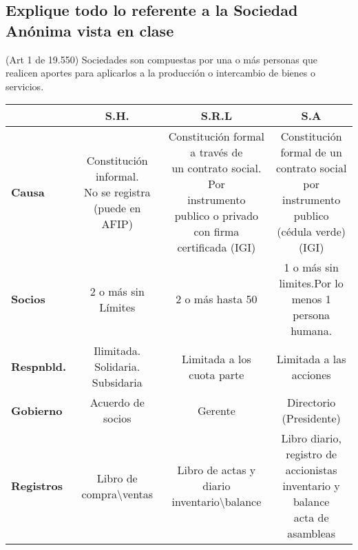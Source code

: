 \documentclass{article}
\begin{document}
\subsection{Explique todo lo referente a la Sociedad Anónima vista en clase}
(Art 1 de 19.550) Sociedades son compuestas por una o más personas que realicen aportes para aplicarlos a la producción o intercambio de bienes o servicios.
\begin{table}[htb!]
{\footnotesize
\begin{tabular}{@{}lccc@{}}
\toprule
\textbf{}                & \textbf{S.H.}                                         & \textbf{S.R.L}                                                                                                    & \textbf{S.A}                                                                           \\ \midrule
\textbf{Causa}           &\makecell{ Constitución informal.\\ No se registra\\ (puede en AFIP)} & \makecell{Constitución formal a través de\\ un contrato social. Por \\ instrumento publico o privado \\con firma  certificada (IGI)} & \makecell{ Constitución formal de un\\ contrato social por instrumento\\ publico (cédula verde) (IGI) }\\ \hline
\textbf{Socios}& 2 o más sin Límites& 2 o más hasta 50& \makecell{1 o más sin limites.Por lo \\ menos 1 persona humana. }\\ \hline
\textbf{Respnbld.} & Ilimitada. Solidaria. Subsidaria & Limitada a los cuota parte& Limitada a las acciones \\\hline
\textbf{Gobierno}        & Acuerdo de socios& Gerente & Directorio (Presidente) \\\hline
\textbf{Registros}       & Libro de compra\textbackslash{}ventas & \makecell{ Libro de actas y \\ diario inventario\textbackslash{}balance} & \makecell{Libro diario, registro de \\ accionistas inventario y balance\\ acta de asambleas }  \\ \bottomrule
\end{tabular}
}
\end{table}
\end{document}
